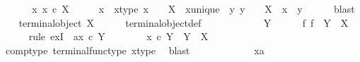 \begin{isabellebody}
\ \ \isamarkupfalse%
\isanewline
{}\isamarkupfalse%
\isanewline
\ \ \isamarkupfalse%
\ {\isachardoublequoteopen}{\isasymexists}{\isacharbang}{\kern0pt}x{\isachardot}{\kern0pt}\ x\ {\isasymin}\isactrlsub c\ X{\isachardoublequoteclose}\isanewline
\ \ \isamarkupfalse%
\ \isamarkupfalse%
\ x\ \ x{\isacharunderscore}{\kern0pt}type{\isacharcolon}{\kern0pt}\ {\isachardoublequoteopen}x\ {\isacharcolon}{\kern0pt}\ {\isasymone}\ {\isasymrightarrow}\ X{\isachardoublequoteclose}\ \ x{\isacharunderscore}{\kern0pt}unique{\isacharcolon}{\kern0pt}\ {\isachardoublequoteopen}{\isasymforall}\ y{\isachardot}{\kern0pt}\ y\ {\isacharcolon}{\kern0pt}\ {\isasymone}\ {\isasymrightarrow}\ X\ {\isasymlongrightarrow}\ x\ {\isacharequal}{\kern0pt}\ y{\isachardoublequoteclose}\isanewline
\ \ \ \ \isamarkupfalse%
\ blast\isanewline
\ \ \isamarkupfalse%
\ {\isachardoublequoteopen}terminal{\isacharunderscore}{\kern0pt}object\ X{\isachardoublequoteclose}\isanewline
\ \ \ \ \isamarkupfalse%
\ terminal{\isacharunderscore}{\kern0pt}object{\isacharunderscore}{\kern0pt}def\ \ \isanewline
\ \ \isamarkupfalse%
\ \isanewline
\ \ \ \ \isamarkupfalse%
\ Y\isanewline
\ \ \ \ \isamarkupfalse%
\ {\isachardoublequoteopen}{\isasymexists}{\isacharbang}{\kern0pt}f{\isachardot}{\kern0pt}\ f\ {\isacharcolon}{\kern0pt}\ Y\ {\isasymrightarrow}\ X{\isachardoublequoteclose}\isanewline
\ \ \ \ \isamarkupfalse%
\ {\isacharparenleft}{\kern0pt}rule\ ex{}I\ {\isacharbrackleft}{\kern0pt}\ a{\isacharequal}{\kern0pt}{\isachardoublequoteopen}x\ {\isasymcirc}\isactrlsub c\ {\isasymbeta}\isactrlbsub Y\isactrlesub {\isachardoublequoteclose}{\isacharbrackright}{\kern0pt}{\isacharparenright}{\kern0pt}\isanewline
\ \ \ \ \ \ \isamarkupfalse%
\ {\isachardoublequoteopen}x\ {\isasymcirc}\isactrlsub c\ {\isasymbeta}\isactrlbsub Y\isactrlesub \ {\isacharcolon}{\kern0pt}\ Y\ {\isasymrightarrow}\ X{\isachardoublequoteclose}\isanewline
\ \ \ \ \ \ \ \ \isamarkupfalse%
\ comp{\isacharunderscore}{\kern0pt}type\ terminal{\isacharunderscore}{\kern0pt}func{\isacharunderscore}{\kern0pt}type\ x{\isacharunderscore}{\kern0pt}type\ \isamarkupfalse%
\ blast\isanewline
\ \ \ \ \isamarkupfalse%
\isanewline
\ \ \ \ \ \ \isamarkupfalse%
\ xa\isanewline
\ \ \ \ \ \ \isamarkupfalse%

\end{isabellebody}
